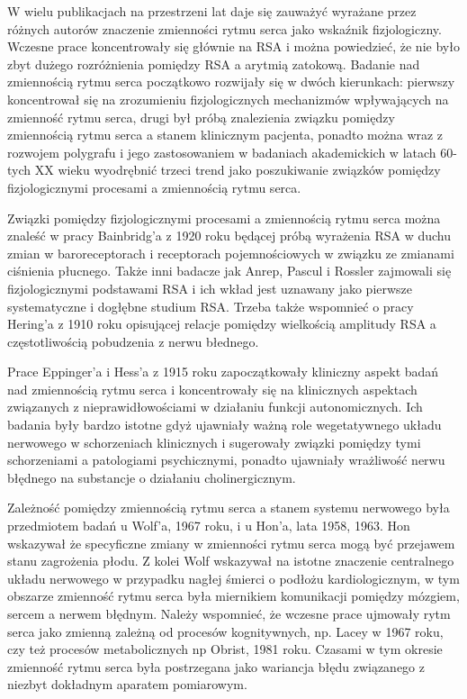 W wielu publikacjach na przestrzeni lat daje się zauważyć wyrażane przez różnych
autorów znaczenie zmienności rytmu serca jako wskaźnik fizjologiczny. Wczesne prace
koncentrowały się głównie na RSA i można powiedzieć, że nie było zbyt dużego
rozróżnienia pomiędzy RSA a arytmią zatokową. Badanie nad zmiennością rytmu serca
początkowo rozwijały się w dwóch kierunkach: pierwszy koncentrował się na
zrozumieniu fizjologicznych mechanizmów wpływających na zmienność rytmu serca,
drugi był próbą znalezienia związku pomiędzy zmiennością rytmu serca a stanem
klinicznym pacjenta, ponadto można wraz z rozwojem polygrafu i jego zastosowaniem w
badaniach akademickich w latach 60-tych XX wieku wyodrębnić trzeci trend jako
poszukiwanie związków pomiędzy fizjologicznymi procesami a zmiennością rytmu serca.

Związki pomiędzy fizjologicznymi procesami a zmiennością rytmu serca można znaleść
w pracy Bainbridg'a z 1920 roku będącej próbą wyrażenia RSA w duchu zmian w
baroreceptorach i receptorach pojemnościowych w związku ze zmianami ciśnienia płucnego.
Także inni badacze jak Anrep, Pascul i Rossler zajmowali się fizjologicznymi podstawami
RSA i ich wkład jest uznawany jako pierwsze systematyczne i dogłębne studium RSA.
Trzeba także wspomnieć o pracy Hering'a z 1910 roku opisującej relacje pomiędzy
wielkością amplitudy RSA a częstotliwością pobudzenia z nerwu błednego.

Prace Eppinger'a i Hess'a z 1915 roku zapoczątkowały kliniczny aspekt badań nad
zmiennością rytmu serca i koncentrowały się na klinicznych aspektach związanych z
nieprawidłowościami w działaniu funkcji autonomicznych. Ich badania były bardzo
istotne gdyż ujawniały ważną role wegetatywnego układu nerwowego w schorzeniach
klinicznych i sugerowały związki pomiędzy tymi schorzeniami a patologiami psychicznymi,
ponadto ujawniały wrażliwość nerwu błędnego na substancje o działaniu cholinergicznym.

Zależność pomiędzy zmiennością rytmu serca a stanem systemu nerwowego była
przedmiotem badań u Wolf'a, 1967 roku, i u Hon'a, lata 1958, 1963. Hon wskazywał że
specyficzne zmiany w zmienności rytmu serca mogą być przejawem stanu zagrożenia płodu.
Z kolei Wolf wskazywał na istotne znaczenie centralnego układu nerwowego w przypadku
nagłej śmierci o podłożu kardiologicznym, w tym obszarze zmienność rytmu serca była
miernikiem komunikacji pomiędzy mózgiem, sercem a nerwem błędnym.
Należy wspomnieć, że wczesne prace ujmowały rytm serca jako zmienną zależną od
procesów kognitywnych, np. Lacey w 1967 roku, czy też procesów metabolicznych np Obrist,
1981 roku. Czasami w tym okresie zmienność rytmu serca była postrzegana jako wariancja
błędu związanego z niezbyt dokładnym aparatem pomiarowym. 

